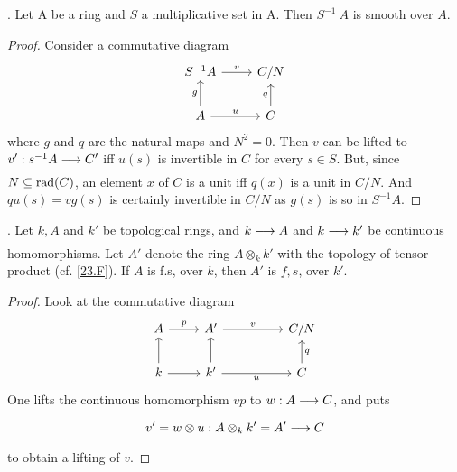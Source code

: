\documentclass[../main]{subfiles}
\begin{document}
\newparagraph {}. Let A be a ring and $S$ a multiplicative set in A. Then $S^{-1} ~A$ is smooth over $A$.

\begin{proof}
Consider a commutative diagram
\[
    \begin{tikzcd}
        S^{-1}A \arrow[r,"v"] &C/N\\
        A\arrow[u,"g"] \arrow[r,"u"] &C\arrow[u,"q"]
    \end{tikzcd}
\]
where $g$ and $q$ are the natural maps and $N^2=0$. Then $v$ can be lifted to $v': s^{-1} A \varrightarrow{} C'$ iff $u(s)$ is invertible in $C$ for every $s \in S$. But, since $N \subseteq \operatorname{rad}(C)$, an element $x$ of $C$ is a unit iff $q(x)$ is a unit in $C / N$. And $q u(s)=vg(s)$ is certainly invertible in $C / N$ as $g(s)$ is so in $S^{-1}A$.
\end{proof}

\newparagraph {}. Let $k, A$ and $k'$ be topological rings, and $k \varrightarrow{} A$ and $k \varrightarrow{} k'$ be continuous homomorphisms. Let $A'$ denote the ring $A \otimes_k k'$ with the topology of tensor product (cf. \ref{23.F}). If $A$ is f.s, over $k$, then $A'$ is $f, s$, over $k'$.

\begin{proof}Look at the commutative diagram
\[\begin{tikzcd}
	A & {A'} && {C/N} \\
	k & {k'} && C
	\arrow["p", from=1-1, to=1-2]
	\arrow[from=2-1, to=1-1]
	\arrow[from=2-1, to=2-2]
	\arrow[from=2-2, to=1-2]
	\arrow["u"', from=2-2, to=2-4]
	\arrow["v", from=1-2, to=1-4]
	\arrow["q"', from=2-4, to=1-4]
\end{tikzcd}\]
One lifts the continuous homomorphism $vp$ to $w: A \varrightarrow{} C$, and puts \[v'=w \otimes u: A \otimes_k k'=A' \varrightarrow{} C\] to obtain a lifting of $v$.
\end{proof} 
\end{document}
